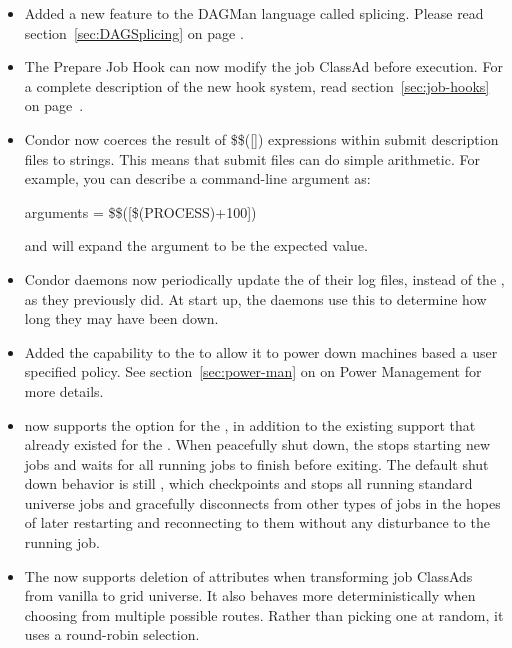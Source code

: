 \begin{itemize}

\item Added a new feature to the DAGMan language called splicing. Please
read section~\ref{sec:DAGSplicing} on page \pageref{sec:DAGSplicing}.

\item The Prepare Job Hook can now modify the job ClassAd before execution.
For a complete description of the new hook system, read
section~\ref{sec:job-hooks} on page~\pageref{sec:job-hooks}.

\item Condor now coerces the result of \$\$([]) expressions within
submit description files to strings.
This means that submit files can do simple arithmetic.
For example, you can describe a command-line argument as:

arguments = \$\$([\$(PROCESS)+100])

and  will expand the argument to be the expected value.

\item Condor daemons now periodically update the  of their
  log files, instead of the , as they previously did.
  At start up, the daemons use this  
  to determine how long they may have been down.

\item Added the capability to the  to allow it to power 
  down machines based a user specified policy.  See 
  section~\ref{sec:power-man} on \pageref{sec:power-man} on
  Power Management for more details.

\item {} now supports the  option for the
  , in addition to the existing support that already existed for
  the .  When peacefully shut down,
  the  stops starting new
  jobs and waits for all running jobs to finish before exiting.  The
  default shut down behavior is still , which checkpoints
  and stops all running standard universe jobs and gracefully
  disconnects from other types of jobs in the hopes of later restarting
  and reconnecting to them without any disturbance to the running job.

\item The  now supports deletion of attributes
  when transforming job ClassAds from vanilla to grid universe.  It also
  behaves more deterministically when choosing from multiple possible
  routes.  Rather than picking one at random, it uses a round-robin
  selection.

\end{itemize}

